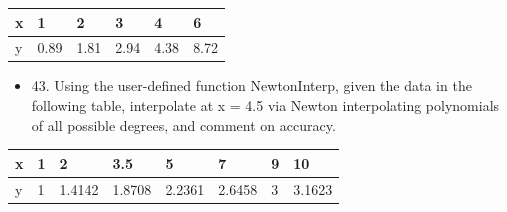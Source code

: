 \documentclass{article}
\begin{document}
\begin{table}[h!]
    \begin{tabular}{llllll}
        \hline
        \multicolumn{1}{|p{30.865313pt}}{\raggedright x} & \multicolumn{1}{|p{30.865313pt}}{\raggedright 1}    & \multicolumn{1}{|p{32.370937pt}}{\raggedright 2}    & \multicolumn{1}{|p{30.1125pt}}{\raggedright 3}    & \multicolumn{1}{|p{30.1125pt}}{\raggedright 4}    & \multicolumn{1}{|p{30.1125pt}|}{\raggedright 6}    \\
        \hline
        \multicolumn{1}{|p{30.865313pt}}{\raggedright y} & \multicolumn{1}{|p{30.865313pt}}{\raggedright 0.89} & \multicolumn{1}{|p{32.370937pt}}{\raggedright 1.81} & \multicolumn{1}{|p{30.1125pt}}{\raggedright 2.94} & \multicolumn{1}{|p{30.1125pt}}{\raggedright 4.38} & \multicolumn{1}{|p{30.1125pt}|}{\raggedright 8.72} \\
        \hline
    \end{tabular}
\end{table}

\begin{itemize}
    \item 43. Using the user-defined function NewtonInterp, given the data
          in the following table, interpolate at x = 4.5 via Newton interpolating
          polynomials of all possible degrees, and comment on accuracy.
\end{itemize}

\begin{table}[h!]
    \begin{tabular}{l|l|l|l|l|l|l|l}
        \hline
        \multicolumn{1}{|p{30.865313pt}}{\raggedright x} & \multicolumn{1}{|p{30.865313pt}}{\raggedright 1} & \multicolumn{1}{|p{32.370937pt}}{\raggedright 2}      & \multicolumn{1}{|p{33.876564pt}}{\raggedright 3.5}    & \multicolumn{1}{|p{37.640625pt}}{\raggedright 5}      & \multicolumn{1}{|p{33.876564pt}}{\raggedright 7}      & \multicolumn{1}{|p{30.1125pt}}{\raggedright 9} & \multicolumn{1}{|p{33.876564pt}|}{\raggedright 10}     \\
        \hline
        \multicolumn{1}{|p{30.865313pt}}{\raggedright y} & \multicolumn{1}{|p{30.865313pt}}{\raggedright 1} & \multicolumn{1}{|p{32.370937pt}}{\raggedright 1.4142} & \multicolumn{1}{|p{33.876564pt}}{\raggedright 1.8708} & \multicolumn{1}{|p{37.640625pt}}{\raggedright 2.2361} & \multicolumn{1}{|p{33.876564pt}}{\raggedright 2.6458} & \multicolumn{1}{|p{30.1125pt}}{\raggedright 3} & \multicolumn{1}{|p{33.876564pt}|}{\raggedright 3.1623} \\
        \hline
    \end{tabular}
\end{table}
\end{document}
